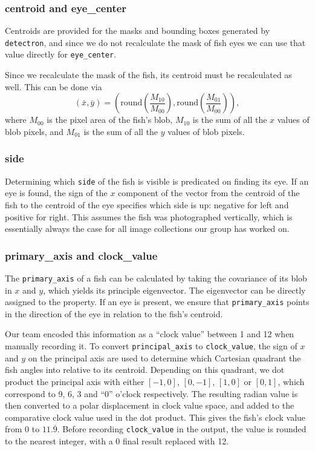 \documentclass[conference]{IEEEtran}
\begin{document}
\subsubsection{centroid and eye\_center}
Centroids are provided for the masks and bounding boxes generated by \verb|detectron|, and since we do not recalculate the mask of fish eyes we can use that value directly for \verb|eye_center|.

Since we recalculate the mask of the fish, its centroid must be recalculated
as well. This can be done via
\begin{equation}
    (\bar{x}, \bar{y}) = (\mathrm{round}(\frac{M_{10}}{M_{00}}), \mathrm{round}(\frac{M_{01}}{M_{00}})),
\end{equation}
where \(M_{00}\) is the pixel area of the fish's blob, \(M_{10}\) is the sum of all the \(x\) values of blob pixels, and \(M_{01}\) is the sum of all the \(y\) values of blob pixels.
\subsubsection{side}
Determining which \verb|side| of the fish is visible is predicated on finding its eye. If an eye is found, the sign of the \(x\) component of the vector from the centroid of the fish to the centroid of the eye specifies which side is up: negative for left and positive for right. This assumes the fish was photographed vertically, which is essentially always the case for all image collections our group has worked on.
\subsubsection{primary\_axis and clock\_value}
The \verb|primary_axis| of a fish can be calculated by taking the covariance of its blob in \(x\) and \(y\), which yields its principle eigenvector.
The eigenvector can be directly assigned to the property. If an eye is
present, we ensure that \verb|primary_axis| points in the direction of the
eye in relation to the fish's centroid.

Our team encoded this information as a ``clock value'' between 1 and 12 when manually recording it. To convert \verb|principal_axis| to \verb|clock_value|, the sign of \(x\) and \(y\) on the principal axis are used to determine which Cartesian quadrant the fish angles into relative to its centroid. 
Depending on this quadrant, we dot product the principal axis with either \([-1,0]\), \([0,-1]\), \([1,0]\) or \([0,1]\), which correspond to 9, 6, 3 and ``0'' o'clock respectively. The resulting radian value is then converted to a polar displacement in clock value space, and added to the comparative clock value used in the dot product. This gives the fish's clock value from
0 to \(11.\overline{9}\). Before recording \verb|clock_value| in the output,
the value is rounded to the nearest integer, with a 0 final result replaced with 12.
\end{document}
